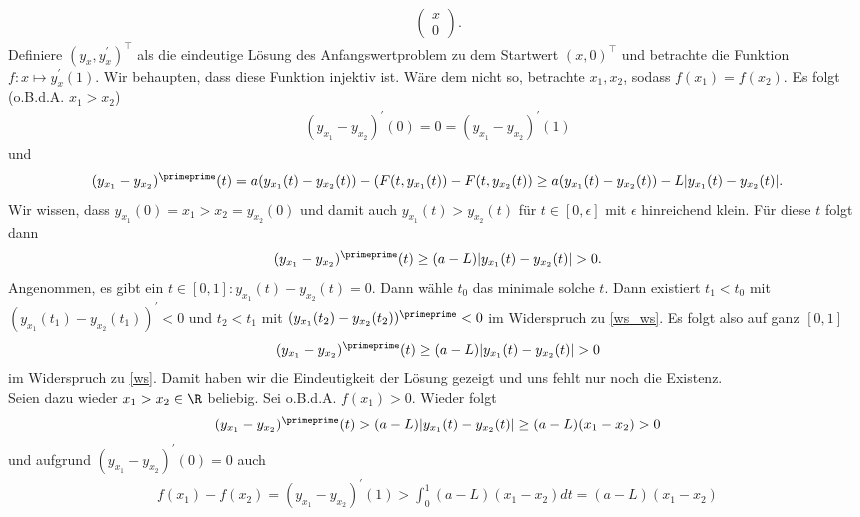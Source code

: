 \begin{solution}
\begin{enumerate}[label = \textbf{\alph*)}]
\begin{align*}
\begin{pmatrix}
      x \\ 0
    \end{pmatrix}.
  \end{align*}
  Definiere $(y_x,y_x^{\prime})^{\top}$ als die eindeutige Lösung des Anfangswertproblem
  zu dem Startwert $(x,0)^{\top}$ und betrachte die Funktion $f: x \mapsto y_x^{\prime}(1)$.
  Wir behaupten, dass diese Funktion injektiv ist. Wäre dem nicht so, betrachte $x_1,x_2$, sodass $f(x_1) = f(x_2)$.
  Es folgt (o.B.d.A. $x_1 > x_2$)
  \begin{align}\label{ws}
    (y_{x_1} - y_{x_2})^{\prime}(0) = 0 = (y_{x_1} - y_{x_2})^{\prime}(1)
  \end{align}
  und
  \begin{align*}
    (y_{x_1} - y_{x_2})^{\primeprime}(t) = a(y_{x_1}(t) - y_{x_2}(t)) - (F(t,y_{x_1}(t)) - F(t,y_{x_2}(t))
    \geq a(y_{x_1}(t) - y_{x_2}(t)) - L|y_{x_1}(t) - y_{x_2}(t)|.
  \end{align*}
  Wir wissen, dass $y_{x_1}(0) = x_1 > x_2 = y_{x_2}(0)$ und damit auch
  $y_{x_1}(t) > y_{x_2}(t)$ für $t \in [0,\epsilon]$ mit $\epsilon$ hinreichend klein. Für diese $t$ folgt dann
  \begin{align}\label{ws_ws}
    (y_{x_1} - y_{x_2})^{\primeprime}(t) \geq (a-L)|y_{x_1}(t) - y_{x_2}(t)| > 0.
  \end{align}
  Angenommen, es gibt ein $t \in [0,1]: y_{x_1}(t) - y_{x_2}(t) = 0$. Dann wähle $t_0$ das minimale solche $t$.
  Dann existiert $t_1 < t_0$ mit $(y_{x_1}(t_1) - y_{x_2}(t_1))^{\prime} < 0$
  und $t_2 < t_1$ mit $(y_{x_1}(t_2) - y_{x_2}(t_2))^{\primeprime} < 0$
  im Widerspruch zu \eqref{ws_ws}.
  Es folgt also auf ganz $[0,1]$
  \begin{align*}
    (y_{x_1} - y_{x_2})^{\primeprime}(t) \geq (a-L)|y_{x_1}(t) - y_{x_2}(t)| > 0
  \end{align*}
  im Widerspruch zu \eqref{ws}. Damit haben wir die Eindeutigkeit der Lösung gezeigt
  und uns fehlt nur noch die Existenz. \\
  Seien dazu wieder $x_1 > x_2 \in \R$ beliebig. Sei o.B.d.A. $f(x_1) >0$. Wieder folgt
  \begin{align*}
    (y_{x_1} - y_{x_2})^{\primeprime}(t) > (a-L)|y_{x_1}(t) - y_{x_2}(t)| \geq (a-L)(x_1 - x_2) > 0
  \end{align*}
  und aufgrund $(y_{x_1} - y_{x_2})^{\prime}(0) = 0$ auch
  \begin{align*}
    f(x_1) - f(x_2) = (y_{x_1} - y_{x_2})^{\prime}(1) > \int_0^1 (a-L)(x_1 - x_2) dt = (a-L)(x_1 - x_2)
  \end{align*}

\end{enumerate}
\end{solution}
